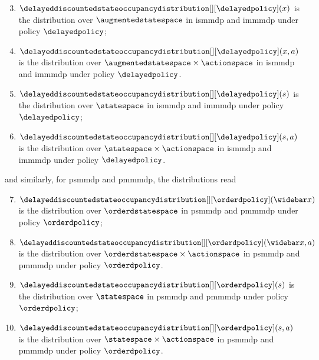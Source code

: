 \begin{enumerate}
\setcounter{enumi}{2}
    \item $\delayeddiscountedstateoccupancydistribution[][\delayedpolicy](x)$ is the distribution over $\augmentedstatespace$ in \gls{ismmdp} and \gls{immmdp} under policy $\delayedpolicy$;
    \item $\delayeddiscountedstateoccupancydistribution[][\delayedpolicy](x,a)$ is the distribution over $\augmentedstatespace\times\actionspace$ in \gls{ismmdp} and \gls{immmdp} under policy $\delayedpolicy$.
    \item $\delayeddiscountedstateoccupancydistribution[][\delayedpolicy](s)$ is the distribution over $\statespace$ in \gls{ismmdp} and \gls{immmdp} under policy $\delayedpolicy$;
    \item $\delayeddiscountedstateoccupancydistribution[][\delayedpolicy](s,a)$ is the distribution over $\statespace\times\actionspace$ in \gls{ismmdp} and \gls{immmdp} under policy $\delayedpolicy$.
\end{enumerate} 
and similarly, for \gls{psmmdp} and \gls{pmmmdp}, the distributions read
\begin{enumerate}
\setcounter{enumi}{6}
    \item $\delayeddiscountedstateoccupancydistribution[][\orderdpolicy](\widebar x)$ is the distribution over $\orderdstatespace$ in \gls{psmmdp} and \gls{pmmmdp} under policy $\orderdpolicy$;
    \item $\delayeddiscountedstateoccupancydistribution[][\orderdpolicy](\widebar x,a)$ is the distribution over $\orderdstatespace\times\actionspace$ in \gls{psmmdp} and \gls{pmmmdp} under policy $\orderdpolicy$.
    \item $\delayeddiscountedstateoccupancydistribution[][\orderdpolicy](s)$ is the distribution over $\statespace$ in \gls{psmmdp} and \gls{pmmmdp} under policy $\orderdpolicy$;
    \item $\delayeddiscountedstateoccupancydistribution[][\orderdpolicy](s,a)$ is the distribution over $\statespace\times\actionspace$ in \gls{psmmdp} and \gls{pmmmdp} under policy $\orderdpolicy$.
\end{enumerate} 